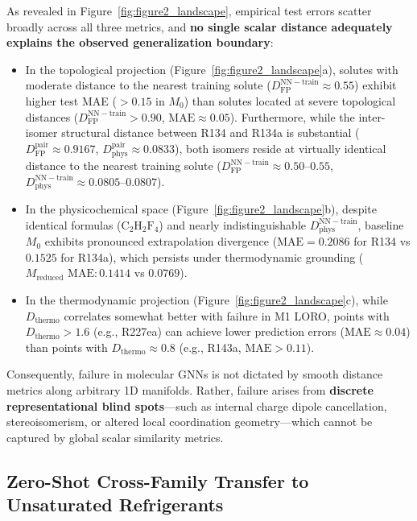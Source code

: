As revealed in Figure~\ref{fig:figure2_landscape}, empirical test errors scatter broadly across all three metrics, and \textbf{no single scalar distance adequately explains the observed generalization boundary}:
\begin{itemize}
    \item In the topological projection (Figure~\ref{fig:figure2_landscape}a), solutes with moderate distance to the nearest training solute ($D_{\mathrm{FP}}^{\mathrm{NN-train}} \approx 0.55$) exhibit higher test MAE ($>0.15$ in $M_0$) than solutes located at severe topological distances ($D_{\mathrm{FP}}^{\mathrm{NN-train}} > 0.90$, $\text{MAE} \approx 0.05$). Furthermore, while the inter-isomer structural distance between R134 and R134a is substantial ($D_{\mathrm{FP}}^{\mathrm{pair}} \approx 0.9167$, $D_{\mathrm{phys}}^{\mathrm{pair}} \approx 0.0833$), both isomers reside at virtually identical distance to the nearest training solute ($D_{\mathrm{FP}}^{\mathrm{NN-train}} \approx 0.50\text{--}0.55$, $D_{\mathrm{phys}}^{\mathrm{NN-train}} \approx 0.0805\text{--}0.0807$).
    \item In the physicochemical space (Figure~\ref{fig:figure2_landscape}b), despite identical formulas ($\text{C}_2\text{H}_2\text{F}_4$) and nearly indistinguishable $D_{\mathrm{phys}}^{\mathrm{NN-train}}$, baseline $M_0$ exhibits pronounced extrapolation divergence ($\text{MAE} = 0.2086$ for R134 vs $0.1525$ for R134a), which persists under thermodynamic grounding ($M_{\mathrm{reduced}}\text{ MAE}: 0.1414$ vs $0.0769$).
    \item In the thermodynamic projection (Figure~\ref{fig:figure2_landscape}c), while $D_{\mathrm{thermo}}$ correlates somewhat better with failure in M1 LORO, points with $D_{\mathrm{thermo}} > 1.6$ (e.g., R227ea) can achieve lower prediction errors ($\text{MAE} \approx 0.04$) than points with $D_{\mathrm{thermo}} \approx 0.8$ (e.g., R143a, $\text{MAE} > 0.11$).
\end{itemize}

Consequently, failure in molecular GNNs is not dictated by smooth distance metrics along arbitrary 1D manifolds. Rather, failure arises from \textbf{discrete representational blind spots}---such as internal charge dipole cancellation, stereoisomerism, or altered local coordination geometry---which cannot be captured by global scalar similarity metrics.

\subsection{Zero-Shot Cross-Family Transfer to Unsaturated Refrigerants}
\label{subsec:unsat_transfer}

